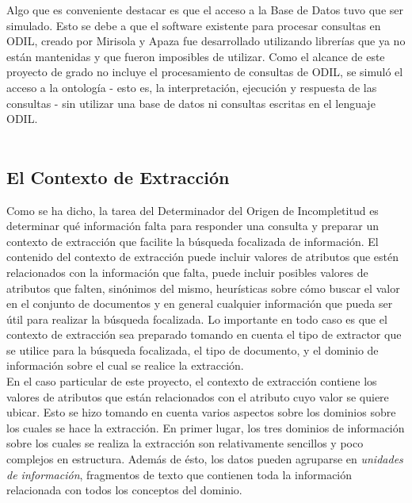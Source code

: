 Algo que es conveniente destacar es que el acceso a la Base de Datos tuvo que ser simulado. Esto se debe a que el software existente para procesar consultas en ODIL, creado por Mirisola y Apaza \cite{ODILImplementation} fue desarrollado utilizando librerías que ya no están mantenidas y que fueron imposibles de utilizar. Como el alcance de este proyecto de grado no incluye el procesamiento de consultas de ODIL, se simuló el acceso a la ontología - esto es, la interpretación, ejecución y respuesta de las consultas - sin utilizar una base de datos ni consultas escritas en el lenguaje ODIL. \\

\\

\subsection{El Contexto de Extracción}\label{sect:diseno-extCont}

Como se ha dicho, la tarea del Determinador del Origen de Incompletitud es determinar qué información falta para responder una consulta y preparar un contexto de extracción que facilite la búsqueda focalizada de información. El contenido del contexto de extracción puede incluir valores de atributos que estén relacionados con la información que falta, puede incluir posibles valores de atributos que falten, sinónimos del mismo, heurísticas sobre cómo buscar el valor en el conjunto de documentos y en general cualquier información que pueda ser útil para realizar la búsqueda focalizada. Lo importante en todo caso es que el contexto de extracción sea preparado tomando en cuenta el tipo de extractor que se utilice para la búsqueda focalizada, el tipo de documento, y el dominio de información sobre el cual se realice la extracción.\\

En el caso particular de este proyecto, el contexto de extracción contiene los valores de atributos que están relacionados con el atributo cuyo valor se quiere ubicar. Esto se hizo tomando en cuenta varios aspectos sobre los dominios sobre los cuales se hace la extracción. En primer lugar, los tres dominios de información sobre los cuales se realiza la extracción son relativamente sencillos y poco complejos en estructura. Además de ésto, los datos pueden agruparse en \emph{unidades de información}, fragmentos de texto que contienen toda la información relacionada con todos los conceptos del dominio.\\


